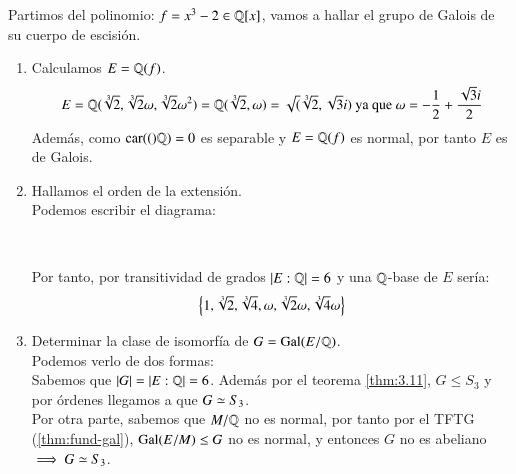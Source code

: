 \begin{eg}
    Partimos del polinomio: $f = x^3 - 2 \in \mathbb{Q}[x]$, vamos a hallar el grupo de Galois de su cuerpo de escisión.
    \begin{enumerate}
        \item Calculamos $E = \mathbb{Q}(f)$.
        $$
            E = \mathbb{Q}(\sqrt[3]{2}, \sqrt[3]{2} \omega, \sqrt[3]{2} \omega^2) = \mathbb{Q}(\sqrt[3]{2}, \omega) = \sqrt(\sqrt[3]{2}, \sqrt{3} i) \text{ ya que } \omega = -\frac{1}{2} + \frac{\sqrt{3}i}{2}
        $$
        Además, como $\mathrm{car}(()\mathbb{Q}) = 0$ es separable y $E = \mathbb{Q}(f)$ es normal, por tanto $E$ es de Galois.
        \item Hallamos el orden de la extensión.\\
        Podemos escribir el diagrama:\\
        \begin{center}
            \\
        \end{center}
        Por tanto, por transitividad de grados $\left|E:\mathbb{Q}\right| = 6$ y una $\mathbb{Q}$-base de $E$ sería:
        $$
            \left\{1, \sqrt[3]{2}, \sqrt[3]{4}, \omega, \sqrt[3]{2}\omega, \sqrt[3]{4}\omega\right\}
        $$
        \item Determinar la clase de isomorfía de $G = \mathrm{Gal}(E/\mathbb{Q})$.\\
        Podemos verlo de dos formas:\\
        Sabemos que $\left|G\right| = \left|E:\mathbb{Q}\right| = 6$. Además por el teorema \ref{thm:3.11}, $G \leq S_3$ y por órdenes llegamos a que $G \simeq S_3$.\\ %
        Por otra parte, sabemos que $M/\mathbb{Q}$ no es normal, por tanto por el TFTG (\ref{thm:fund-gal}), $\mathrm{Gal}(E/M) \leq G$ no es normal, y entonces $G$ no es abeliano $\implies G \simeq S_3$.


\end{enumerate}
\end{eg}
